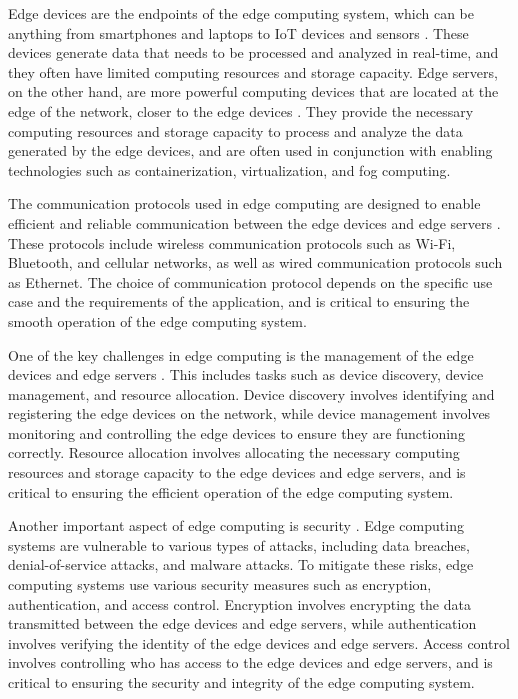 \documentclass[11pt]{article}
\begin{document}
Edge devices are the endpoints of the edge computing system, which can be anything from smartphones and laptops to IoT devices and sensors \cite{ref2}. These devices generate data that needs to be processed and analyzed in real-time, and they often have limited computing resources and storage capacity. Edge servers, on the other hand, are more powerful computing devices that are located at the edge of the network, closer to the edge devices \cite{ref24}. They provide the necessary computing resources and storage capacity to process and analyze the data generated by the edge devices, and are often used in conjunction with enabling technologies such as containerization, virtualization, and fog computing.

The communication protocols used in edge computing are designed to enable efficient and reliable communication between the edge devices and edge servers \cite{ref25}. These protocols include wireless communication protocols such as Wi-Fi, Bluetooth, and cellular networks, as well as wired communication protocols such as Ethernet. The choice of communication protocol depends on the specific use case and the requirements of the application, and is critical to ensuring the smooth operation of the edge computing system.

One of the key challenges in edge computing is the management of the edge devices and edge servers \cite{ref26}. This includes tasks such as device discovery, device management, and resource allocation. Device discovery involves identifying and registering the edge devices on the network, while device management involves monitoring and controlling the edge devices to ensure they are functioning correctly. Resource allocation involves allocating the necessary computing resources and storage capacity to the edge devices and edge servers, and is critical to ensuring the efficient operation of the edge computing system.

Another important aspect of edge computing is security \cite{ref27}. Edge computing systems are vulnerable to various types of attacks, including data breaches, denial-of-service attacks, and malware attacks. To mitigate these risks, edge computing systems use various security measures such as encryption, authentication, and access control. Encryption involves encrypting the data transmitted between the edge devices and edge servers, while authentication involves verifying the identity of the edge devices and edge servers. Access control involves controlling who has access to the edge devices and edge servers, and is critical to ensuring the security and integrity of the edge computing system.
\end{document}
